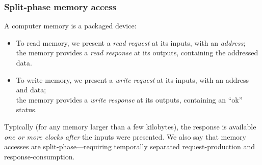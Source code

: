 \begin{frame}
\frametitle{Split-phase memory access}

\begin{center}
\end{center}

\vspace*{2ex}

A computer memory is a packaged device:
\begin{itemize}

 \item To read memory, we present a \emph{read request} at its inputs,
       with an \emph{address}; \\
       the memory provides a \emph{read response} at its outputs,
       containing the addressed data.

 \item To write memory, we present a \emph{write request} at its
       inputs, with an address and data; \\
       the memory provides a \emph{write response} at its outputs,
       containing an ``ok'' status.

\end{itemize}

\vspace*{2ex}

Typically (for any memory larger than a few kilobytes), the response
is available \emph{one or more clocks after} the inputs were
presented.  We also say that memory accesses are
\alert{split-phase}---requiring temporally separated request-production
and response-consumption.

\end{frame}



